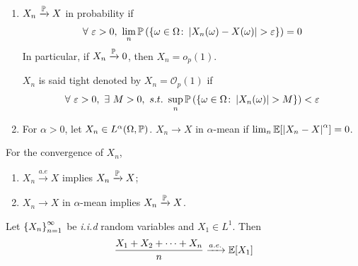 \documentclass[a4paper,12pt]{article}
\begin{document}
\begin{itemize}
\begin{enumerate}[label=(\arabic*)]
    \item $X_n\xrightarrow{\mathbb{P}}X$ in probability if 
    \begin{equation*}
      \forall~\varepsilon>0,~\lim_{n}\mathbb{P}\left(\left\{\omega \in \Omega \colon \left\lvert X_n(\omega) -X(\omega)\right\lvert > \varepsilon\right\}\right) = 0
    \end{equation*}
    In particular, if $X_n\xrightarrow{\mathbb{P}} 0$, then $X_n = o_{p}(1)$.
    \begin{rmk}
      $X_n$ is said tight denoted by $X_n = \mathcal{O}_p(1)$ if 
      \begin{equation*}
        \forall~\varepsilon > 0,~\exists~M>0,~s.t.~\sup_n \mathbb{P}\left(\left\{\omega \in \Omega \colon \left\lvert X_n(\omega)\right\lvert > M\right\}\right) < \varepsilon
      \end{equation*}
    \end{rmk}

    \item For $\alpha > 0$, let $X_n \in L^{\alpha}(\Omega, \mathbb{P})$. $X_n \rightarrow X$ in $\alpha$-mean if $\lim_n\mathbb{E}[\left\lvert X_n - X\right\lvert^{\alpha}] = 0$.
  \end{enumerate}
  \begin{thm}
    For the convergence of $X_n$,
    \begin{enumerate}[label=(\arabic*)]
      \item $X_n\xrightarrow{a.e}X$ implies $X_n\xrightarrow{\mathbb{P}}X$;
      \item $X_n \rightarrow X$ in $\alpha$-mean implies $X_n\xrightarrow{\mathbb{P}}X$.
    \end{enumerate}
  \end{thm}
  \begin{thm}
    Let $\left\{X_n\right\}_{n=1}^{\infty}$ be \emph{i.i.d} random variables and $X_1 \in L^1$. Then
    \begin{equation*}
      \frac{X_1 + X_2 + \cdots + X_n}{n} \xrightarrow{a.e.} \mathbb{E}[X_1]
    \end{equation*}
  \end{thm}


\end{itemize}
\end{document}
